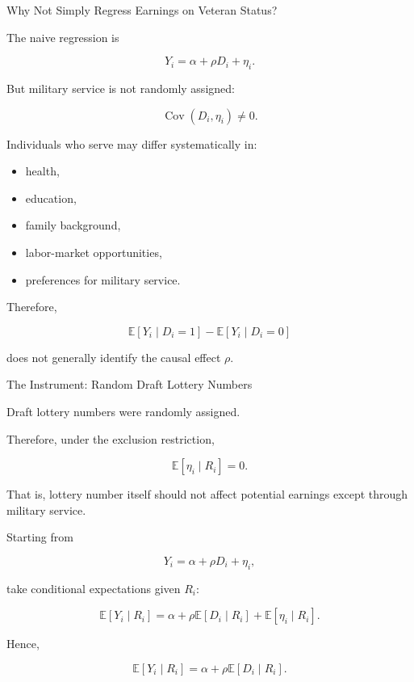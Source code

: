 \documentclass[aspectratio=169]{beamer}
\newcommand{\E}{\mathbb{E}}
\newcommand{\Cov}{\operatorname{Cov}}
\begin{document}
\begin{frame}{Why Not Simply Regress Earnings on Veteran Status?}

The naive regression is

\[
Y_i = \alpha + \rho D_i + \eta_i.
\]

But military service is not randomly assigned:

\[
\boxed{
\Cov(D_i,\eta_i)\neq 0.
}
\]

Individuals who serve may differ systematically in:

\begin{itemize}
    \item health,
    \item education,
    \item family background,
    \item labor-market opportunities,
    \item preferences for military service.
\end{itemize}

Therefore,

\[
\E[Y_i\mid D_i=1]-\E[Y_i\mid D_i=0]
\]

does not generally identify the causal effect \(\rho\).

\end{frame}

\begin{frame}{The Instrument: Random Draft Lottery Numbers}

Draft lottery numbers were randomly assigned.

Therefore, under the exclusion restriction,

\[
\boxed{
\E[\eta_i\mid R_i]=0.
}
\]

That is, lottery number itself should not affect potential earnings except through military service.

Starting from

\[
Y_i=\alpha+\rho D_i+\eta_i,
\]

take conditional expectations given \(R_i\):

\[
\E[Y_i\mid R_i]
=
\alpha
+
\rho\E[D_i\mid R_i]
+
\E[\eta_i\mid R_i].
\]

Hence,

\[
\boxed{
\E[Y_i\mid R_i]
=
\alpha+\rho\E[D_i\mid R_i].
}
\]

\end{frame}
\end{document}
